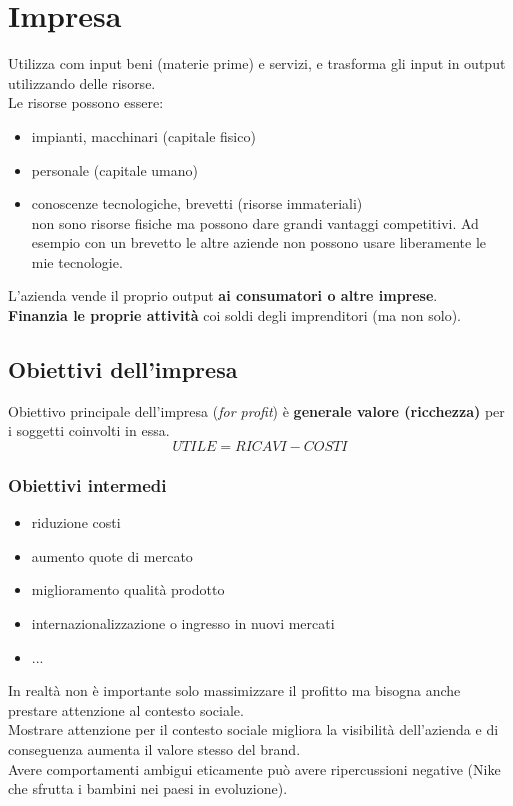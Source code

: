 \documentclass[12pt, letterpaper]{article}
\begin{document}
	\section{Impresa}
	
		Utilizza com input beni (materie prime) e servizi, e trasforma gli input in output utilizzando delle risorse.\\
		Le risorse possono essere:
			
			\begin{itemize}
				\item impianti, macchinari (capitale fisico)
				\item personale (capitale umano)
				\item conoscenze tecnologiche, brevetti (risorse immateriali)\\
					non sono risorse fisiche ma possono dare grandi vantaggi competitivi. Ad esempio con un brevetto le altre aziende non possono usare liberamente le mie tecnologie.
			\end{itemize}
	
		L'azienda vende il proprio output \textbf{ai consumatori o altre imprese}.\\
		\textbf{Finanzia le proprie attività} coi soldi degli imprenditori (ma non solo).
		
		
	\subsection{Obiettivi dell'impresa}
	
		Obiettivo principale dell'impresa (\emph{for profit}) è \textbf{generale valore (ricchezza)} per i soggetti coinvolti in essa.
		$$ UTILE = RICAVI - COSTI $$
		
		\subsubsection{Obiettivi intermedi}
		
			\begin{itemize}
				\item riduzione costi
				\item aumento quote di mercato
				\item miglioramento qualità prodotto
				\item internazionalizzazione o ingresso in nuovi mercati
				\item ...
			\end{itemize}
		
		In realtà non è importante solo massimizzare il profitto ma bisogna anche prestare attenzione al contesto sociale.\\
		Mostrare attenzione per il contesto sociale migliora la visibilità dell'azienda e di conseguenza aumenta il valore stesso del brand.\\
		Avere comportamenti ambigui eticamente può avere ripercussioni negative (Nike che sfrutta i bambini nei paesi in evoluzione).
		
		
		
		
		
		
		
		
		
		
		
		
		
	
\end{document}
